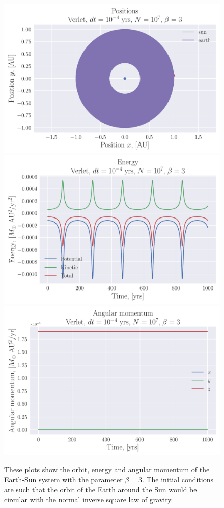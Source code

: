 \documentclass[reprint, english,notitlepage,nofootinbib]{revtex4-1}  %
\begin{document}
\begin{figure}[h]
	\centering
	\includegraphics[width=\linewidth]{../output/earth_sun_circ-verlet-4-7-3.pdf}
  \includegraphics[width=\linewidth]{../output/earth_sun_circ-verlet-4-7-3_energy.pdf}
  \includegraphics[width=\linewidth]{../output/earth_sun_circ-verlet-4-7-3_ang_mom.pdf}
	\caption{These plots show the orbit, energy and angular momentum of the Earth-Sun system with the parameter $\beta = 3$. The initial conditions are such that the orbit of the Earth around the Sun would be circular with the normal inverse square law of gravity.}
	\label{fig:earth_sun_circ_beta=3}
\end{figure}
\end{document}
